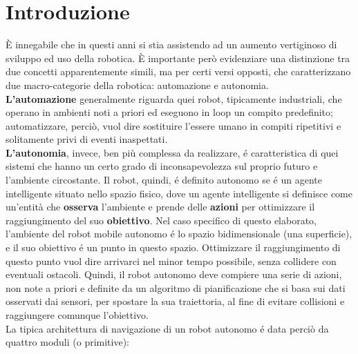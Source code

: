 \documentclass[14pt,a4paper]{extarticle}
\begin{document}
\section{Introduzione}
È innegabile che in questi anni si stia assistendo ad un aumento vertiginoso di sviluppo ed uso della robotica. È importante però evidenziare una distinzione tra due concetti apparentemente simili, ma per certi versi opposti, che caratterizzano due macro-categorie della robotica: automazione e autonomia.\\ 
\textbf{L'automazione} generalmente riguarda quei robot, tipicamente industriali, che operano in ambienti noti a priori ed eseguono in loop un compito predefinito; automatizzare, perciò, vuol dire sostituire l'essere umano in compiti ripetitivi e solitamente privi di eventi inaspettati.\\
\textbf{L'autonomia}, invece, ben più complessa da realizzare, é caratteristica di quei sistemi che hanno un certo grado di inconsapevolezza sul proprio futuro e l'ambiente circostante.  Il robot, quindi, é definito autonomo se é un agente intelligente situato nello spazio fisico, dove un agente intelligente si definisce come un'entità che \textbf{osserva} l'ambiente e prende delle \textbf{azioni} per ottimizzare il raggiungimento del suo \textbf{obiettivo}\cite{murphy}. Nel caso specifico di questo elaborato, l'ambiente del robot mobile autonomo é lo spazio bidimensionale (una superficie), e il suo obiettivo é un punto in questo spazio. Ottimizzare il raggiungimento di questo punto vuol dire arrivarci nel minor tempo possibile, senza collidere con eventuali ostacoli. Quindi, il robot autonomo deve compiere una serie di azioni, non note a priori e definite da un algoritmo di pianificazione che si basa sui dati osservati dai sensori, per spostare la sua traiettoria, al fine di evitare collisioni e raggiungere comunque l'obiettivo.\\
La tipica architettura di navigazione di un robot autonomo é data perciò da quattro moduli (o primitive): 
\end{document}

